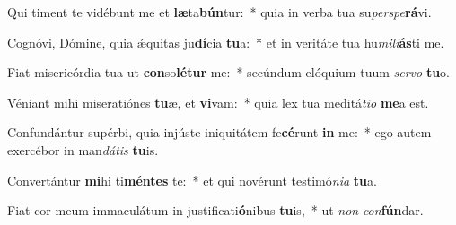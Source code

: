 \item Qui timent te vidébunt me et \textbf{læ}ta\textbf{bún}tur:~* quia in verba tua su\textit{per}\textit{spe}\textbf{rá}vi.
\item Cognóvi, Dómine, quia ǽquitas ju\textbf{dí}cia \textbf{tu}a:~* et in veritáte tua hu\textit{mi}\textit{li}\textbf{ás}ti me.
\item Fiat misericórdia tua ut \textbf{con}so\textbf{lé}\textbf{tur} me:~* secúndum elóquium tuum \textit{ser}\textit{vo} \textbf{tu}o.
\item Véniant mihi miseratiónes \textbf{tu}æ, et \textbf{vi}vam:~* quia lex tua meditá\textit{ti}\textit{o} \textbf{me}a est.
\item Confundántur supérbi, quia injúste iniquitátem fe\textbf{cé}runt \textbf{in} me:~* ego autem exercébor in man\textit{dá}\textit{tis} \textbf{tu}is.
\item Convertántur \textbf{mi}hi ti\textbf{mén}\textbf{tes} te:~* et qui novérunt testimó\textit{ni}\textit{a} \textbf{tu}a.
\item Fiat cor meum immaculátum in justificati\textbf{ó}nibus \textbf{tu}is,~* ut \textit{non} \textit{con}\textbf{fún}dar.
